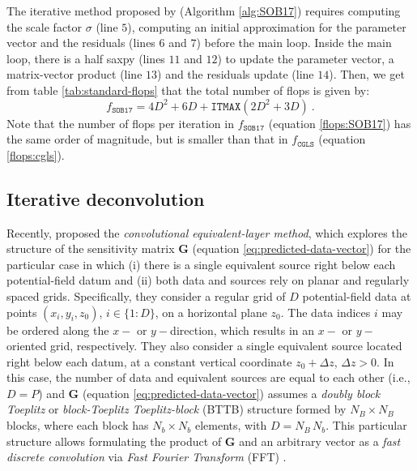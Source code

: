 \documentclass[utf8]{FrontiersinHarvard} %
\begin{document}
	The iterative method proposed by \citet{siqueira-etal2017} (Algorithm \ref{alg:SOB17}) 
	requires computing the scale factor $\sigma$ (line $5$), computing an initial 
	approximation for the parameter vector and the residuals (lines $6$ and $7$) 
	before the main loop.
	Inside the main loop, there is a half saxpy 
	(lines $11$ and $12$) to update the parameter vector, a matrix-vector product 
	(line $13$) and the residuals update (line $14$). Then, we get from table \ref{tab:standard-flops} that the total number of flops is given by:
	\begin{equation}
		f_{\mathtt{SOB17}} = 4D^{2} + 6D + \mathtt{ITMAX} \left( 2D^{2} + 3D \right) \: .
		\label{flops:SOB17}
	\end{equation}
	Note that the number of flops per iteration in $f_{\mathtt{SOB17}}$ (equation \ref{flops:SOB17}) has the same order of magnitude, but is smaller than that in
	$f_{\mathtt{CGLS}}$ (equation \ref{flops:cgls}).
	
	\subsection{Iterative deconvolution}
	
	Recently, \citet{takahashi-etal2020,takahashi-etal2022} proposed the \textit{convolutional equivalent-layer method}, 
	which explores the structure of the sensitivity matrix $\mathbf{G}$ (equation \ref{eq:predicted-data-vector}) for 
	the particular case in which (i) there is a single equivalent source right below each potential-field
	datum and (ii) both data and sources rely on planar and regularly spaced grids.
	Specifically, they consider a regular grid of $D$ 
	potential-field data at points $(x_{i}, y_{i}, z_{0})$, $i \in \{1:D\}$, on a horizontal plane $z_{0}$.
	The data indices $i$ may be ordered along the $x-$ or $y-$direction, which results in an
	$x-$ or $y-$oriented grid, respectively.
	They also consider a single equivalent source located right below each datum, at a constant vertical coordinate
	$z_{0} + \Delta z$, $\Delta z > 0$.
	In this case, the number of data and equivalent sources are equal to each other (i.e., $D = P$) and
	$\mathbf{G}$ (equation \ref{eq:predicted-data-vector}) assumes a \textit{doubly block Toeplitz} \cite[][p. 28]{jain1989} or 
	\textit{block-Toeplitz Toeplitz-block} (BTTB) \cite[][p. 67]{chan-jin2007} structure formed by $N_{B} \times N_{B}$
	blocks, where each block has $N_{b} \times N_{b}$ elements, with $D = N_{B} \, N_{b}$.
	This particular structure allows formulating the product
	of $\mathbf{G}$ and an arbitrary vector as a \textit{fast discrete convolution} via 
	\textit{Fast Fourier Transform} (FFT) \cite[][section 4.2]{vanloan1992}.
	
\end{document}
